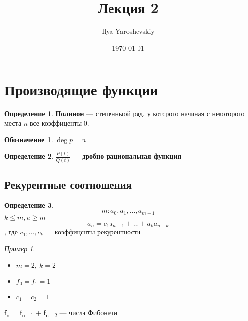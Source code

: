 \documentclass[english]{article}
\author{Ilya Yaroshevskiy}
\date{\today}
\title{Лекция 2}
\theoremstyle{plain}
\theoremstyle{remark}
\newtheorem*{examp}{Пример}
\theoremstyle{definition}
\newtheorem*{definition}{Определение}
\newtheorem*{symb}{Обозначение}
\begin{document}
\maketitle
\tableofcontents


\section{Производящие функции}
\label{sec:org6af3296}
\begin{definition}
\textbf{Полином} --- степенныой ряд, у которого начиная с некоторого места
 \(n\) все коэффиценты 0.
\end{definition}
\begin{symb}
\(\deg p = n\)
\end{symb}
\begin{definition}
\(\frac{P(t)}{Q(t)}\) --- \textbf{дробно рациональная функция}
\end{definition}
\subsection{Рекурентные соотношения}
\label{sec:org3d71388}
\begin{definition}
\[ m: a_0, a_1, \dots, a_{m - 1} \]
\(k \le m, n \ge m\) \[ a_n = c_1a_{n-1} + \dots + a_ka_{n - k} \], где \(c_1, \dots, c_k\) --- коэффиценты рекурентности
\end{definition}
\begin{examp}
\-
\begin{itemize}
\item \(m = 2,\ k = 2\)
\item \(f_0 = f_1 = 1\)
\item \(c_1 = c_2 = 1\)
\end{itemize}
f\textsubscript{n} = f\textsubscript{n - 1} + f\textsubscript{n - 2} --- числа Фибоначи
\end{examp}
\end{document}
